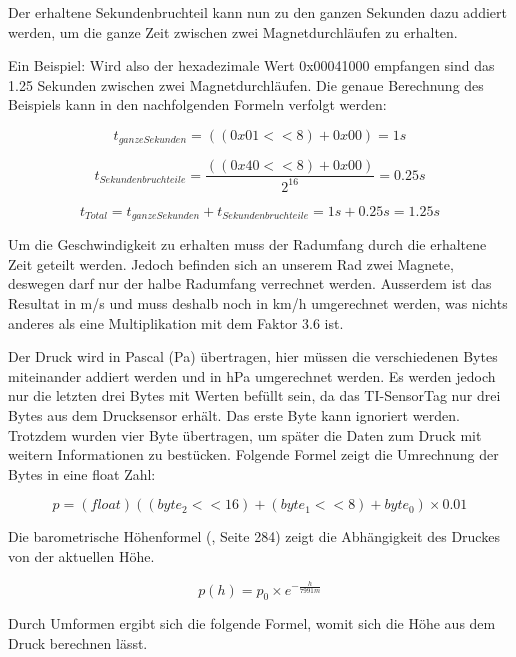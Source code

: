 Der erhaltene Sekundenbruchteil kann nun zu den ganzen Sekunden dazu addiert werden, um die ganze Zeit zwischen zwei Magnetdurchläufen zu erhalten.

Ein Beispiel: Wird also der hexadezimale Wert 0x00041000 empfangen sind das 1.25 Sekunden zwischen zwei Magnetdurchläufen. Die genaue Berechnung des Beispiels kann in den nachfolgenden Formeln verfolgt werden:

\begin{equation}
	t_{ganze Sekunden} = ((0x01 << 8) + 0x00) = 1 s
\end{equation}

\begin{equation}
	t_{Sekundenbruchteile} = \frac{((0x40 << 8) + 0x00)}{2^{16}} = 0.25 s
\end{equation}

\begin{equation}
	t_{Total} = t_{ganze Sekunden} + t_{Sekundenbruchteile} = 1 s + 0.25 s = 1.25 s
\end{equation}

Um die Geschwindigkeit zu erhalten muss der Radumfang durch die erhaltene Zeit geteilt werden. Jedoch befinden sich an unserem Rad zwei Magnete, deswegen darf nur der halbe Radumfang verrechnet werden. Ausserdem ist das Resultat in m/s und muss deshalb noch in km/h umgerechnet werden, was nichts anderes als eine Multiplikation mit dem Faktor 3.6 ist.

Der Druck wird in Pascal (Pa) übertragen, hier müssen die verschiedenen Bytes miteinander addiert werden und in hPa umgerechnet werden. Es werden jedoch nur die letzten drei Bytes mit Werten befüllt sein, da das TI-SensorTag nur drei Bytes aus dem Drucksensor erhält. Das erste Byte kann ignoriert werden. Trotzdem wurden vier Byte übertragen, um später die Daten zum Druck mit weitern Informationen zu bestücken. Folgende Formel zeigt die Umrechnung der Bytes in eine float Zahl:

\begin{equation}
	p = (float)((byte_2 << 16) + (byte_1 << 8) + byte_0) \times 0.01
\end{equation}

Die barometrische Höhenformel (\cite{Formelbuch}, Seite 284) zeigt die Abhängigkeit des Druckes von der aktuellen Höhe.

\begin{equation}
	p(h) = p_0 \times e^{-\frac{h}{7991 m}}
\end{equation}

Durch Umformen ergibt sich die folgende Formel, womit sich die Höhe aus dem Druck berechnen lässt.

